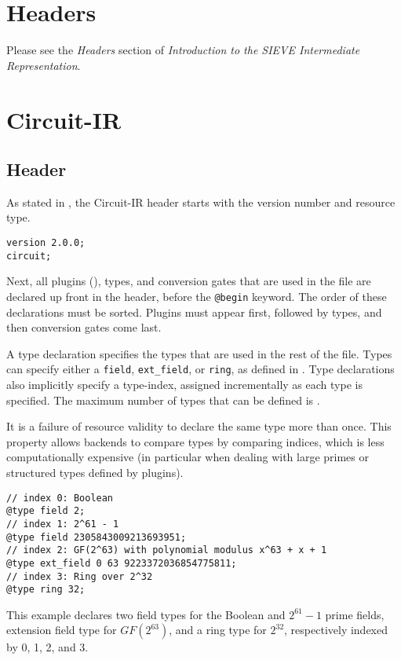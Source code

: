 \section{Headers}
\label{sec:headers}

Please see the \textit{Headers} section of \textit{Introduction to the SIEVE Intermediate Representation}.

\section{Circuit-IR}
\label{sec:circuitir}

\subsection{Header}
\label{subsec:headers}

As stated in , the Circuit-IR header starts with the version number and resource type.
\begin{lstlisting}[language=ir]
version 2.0.0;
circuit;
\end{lstlisting}
Next, all plugins (), types, and conversion gates that are used in the file are declared up front in the header, before
the \texttt{@begin} keyword.
The order of these declarations must be sorted.
Plugins must appear first, followed by types, and then conversion gates come last.

A type declaration specifies the types that are used in the rest of the file.
Types can specify either a \texttt{field}, \texttt{ext\_field}, or \texttt{ring}, as defined in .
Type declarations also implicitly specify a type-index, assigned incrementally as each type is specified. The maximum number of types that can be defined is \maxfieldcount.

It is a failure of resource validity to declare the same type more than once. This property allows backends to compare types by comparing indices, which is less computationally expensive
(in particular when dealing with large primes or structured types defined by plugins).

\begin{lstlisting}[language=ir]
// index 0: Boolean
@type field 2;
// index 1: 2^61 - 1
@type field 2305843009213693951;
// index 2: GF(2^63) with polynomial modulus x^63 + x + 1
@type ext_field 0 63 9223372036854775811;
// index 3: Ring over 2^32
@type ring 32;
\end{lstlisting}
%
This example declares two field types for the Boolean and $2^{61}-1$ prime fields, extension field type for $GF(2^{63})$, and a ring type for $2^{32}$, respectively indexed by 0, 1, 2, and 3.

